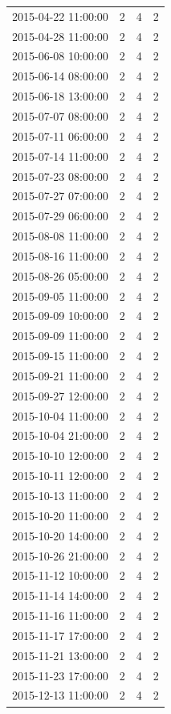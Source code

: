 \begin{tabular}{lrrr}
2015-04-22 11:00:00 & 2 & 4 & 2 \\
2015-04-28 11:00:00 & 2 & 4 & 2 \\
2015-06-08 10:00:00 & 2 & 4 & 2 \\
2015-06-14 08:00:00 & 2 & 4 & 2 \\
2015-06-18 13:00:00 & 2 & 4 & 2 \\
2015-07-07 08:00:00 & 2 & 4 & 2 \\
2015-07-11 06:00:00 & 2 & 4 & 2 \\
2015-07-14 11:00:00 & 2 & 4 & 2 \\
2015-07-23 08:00:00 & 2 & 4 & 2 \\
2015-07-27 07:00:00 & 2 & 4 & 2 \\
2015-07-29 06:00:00 & 2 & 4 & 2 \\
2015-08-08 11:00:00 & 2 & 4 & 2 \\
2015-08-16 11:00:00 & 2 & 4 & 2 \\
2015-08-26 05:00:00 & 2 & 4 & 2 \\
2015-09-05 11:00:00 & 2 & 4 & 2 \\
2015-09-09 10:00:00 & 2 & 4 & 2 \\
2015-09-09 11:00:00 & 2 & 4 & 2 \\
2015-09-15 11:00:00 & 2 & 4 & 2 \\
2015-09-21 11:00:00 & 2 & 4 & 2 \\
2015-09-27 12:00:00 & 2 & 4 & 2 \\
2015-10-04 11:00:00 & 2 & 4 & 2 \\
2015-10-04 21:00:00 & 2 & 4 & 2 \\
2015-10-10 12:00:00 & 2 & 4 & 2 \\
2015-10-11 12:00:00 & 2 & 4 & 2 \\
2015-10-13 11:00:00 & 2 & 4 & 2 \\
2015-10-20 11:00:00 & 2 & 4 & 2 \\
2015-10-20 14:00:00 & 2 & 4 & 2 \\
2015-10-26 21:00:00 & 2 & 4 & 2 \\
2015-11-12 10:00:00 & 2 & 4 & 2 \\
2015-11-14 14:00:00 & 2 & 4 & 2 \\
2015-11-16 11:00:00 & 2 & 4 & 2 \\
2015-11-17 17:00:00 & 2 & 4 & 2 \\
2015-11-21 13:00:00 & 2 & 4 & 2 \\
2015-11-23 17:00:00 & 2 & 4 & 2 \\
2015-12-13 11:00:00 & 2 & 4 & 2 \\

\end{tabular}
